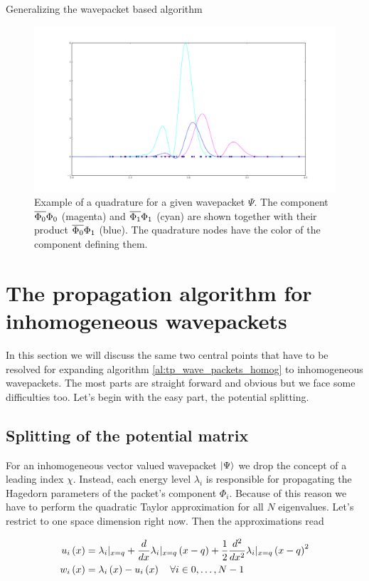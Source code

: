 \begin{chapter}{Generalizing the wavepacket based algorithm}
\begin{figure}
  \centering
  \includegraphics[width=\linewidth]{./figures/quadrature_nodes_mixing.pdf}
  \caption{Example of a quadrature for a given wavepacket $\Psi$. The component
  $\overline{\Phi_0} \Phi_0$ (magenta) and $\overline{\Phi_1} \Phi_1$ (cyan) are shown
  together with their product $\overline{\Phi_0} \Phi_1$ (blue). The quadrature nodes
  have the color of the component defining them.}
  \label{fig:quadrature_nodes_mixing}
\end{figure}


\section{The propagation algorithm for inhomogeneous wavepackets}

In this section we will discuss the same two central points that have to be resolved
for expanding algorithm \ref{al:tp_wave_packets_homog} to inhomogeneous
wavepackets. The most parts are straight forward and obvious but we face some
difficulties too. Let's begin with the easy part, the potential splitting.

\subsection{Splitting of the potential matrix}

For an inhomogeneous vector valued wavepacket $\Ket{\Psi}$ we drop the concept of
a leading index $\chi$. Instead, each energy level $\lambda_i$ is responsible for
propagating the Hagedorn parameters of the packet's component $\Phi_i$. Because of
this reason we have to perform the quadratic Taylor approximation for all $N$
eigenvalues. Let's restrict to one space dimension right now. Then the approximations
read

\begin{equation} \label{eq:pot_taylor_split_inhomog}
\begin{split}
  u_i\left( x \right) & = \lambda_i|_{x=q} + \frac{d}{dx}\lambda_i|_{x=q}\left( x-q \right) + \frac{1}{2} \frac{d^2}{dx^2}\lambda_i|_{x=q} \left( x-q \right)^2 \\
  w_i\left( x \right) & = \lambda_i\left( x \right) - u_i\left( x \right) \quad \forall i \in 0, \ldots, N-1
\end{split}
\end{equation}


\end{chapter}
